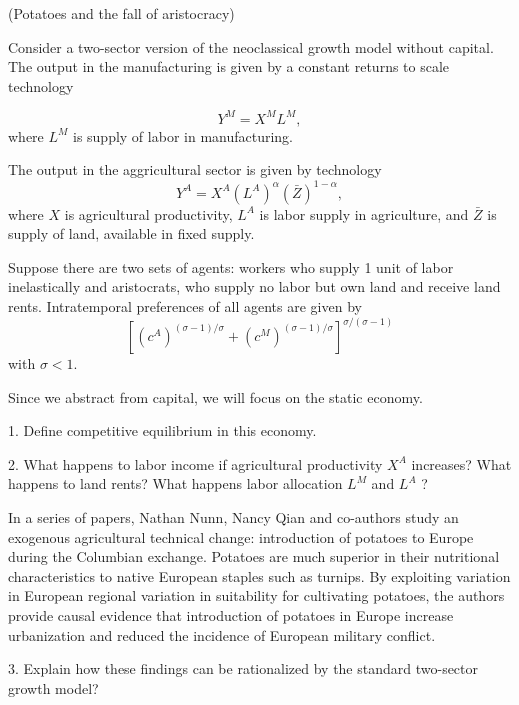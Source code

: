 (Potatoes and the fall of aristocracy)

Consider a two-sector version of the neoclassical growth model without capital. The output in the manufacturing is given by a constant returns to scale technology

$$
Y^M=X^M L^M,
$$
where $L^M$ is supply of labor in manufacturing.

The output in the aggricultural sector is given by technology
$$
Y^A=X^A\left(L^A\right)^\alpha(\bar{Z})^{1-\alpha},
$$
where $X$ is agricultural productivity, $L^A$ is labor supply in agriculture, and $\bar{Z}$ is supply of land, available in fixed supply.

Suppose there are two sets of agents: workers who supply 1 unit of labor inelastically and aristocrats, who supply no labor but own land and receive land rents. Intratemporal preferences of all agents are given by
$$
\left[\left(c^A\right)^{(\sigma-1) / \sigma}+\left(c^M\right)^{(\sigma-1) / \sigma}\right]^{\sigma /(\sigma-1)}
$$
with $\sigma<1$.

Since we abstract from capital, we will focus on the static economy.

1. Define competitive equilibrium in this economy.

2. What happens to labor income if agricultural productivity $X^A$ increases? What happens to land rents? What happens labor allocation $L^M$ and $L^A$ ?

In a series of papers, Nathan Nunn, Nancy Qian and co-authors study an exogenous agricultural technical change: introduction of potatoes to Europe during the Columbian exchange. Potatoes are much superior in their nutritional characteristics to native European staples such as turnips. By exploiting variation in European regional variation in suitability for cultivating potatoes, the authors provide causal evidence that introduction of potatoes in Europe increase urbanization and reduced the incidence of European military conflict.

3. Explain how these findings can be rationalized by the standard two-sector growth model?